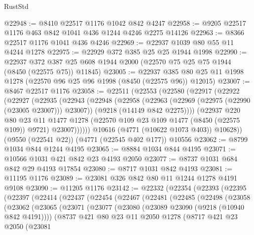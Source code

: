 \begin{lexlean}{RustStd}
\begin{coremodule}
@22948 := @8410 @22517 @1176 @1042 @842 @4247
@22958 := @9205 @22517 @1176 @463 @842 @1041 @436 @1244 @4246 @2275 @14126
@22963 := @8366 @22517 @1176 @1041 @436 @4246
@22969 := @22937 @1039 @80 @55 @11 @4244 @1278
@22975 := @22929 @372 @385 @25 @25 @1944 @1998
@22990 := @22937
    @372
    @387
    @25
    @608
    @1944
    @2000
    (@22570 @75 @25 @75 @1944 (@8450 (@22575 @75)) @11845)
@23005 := @22937 @385 @80 @25 @11 @1998 @1278 (@22570 @96 @25 @96 @1998 (@8450 (@22575 @96)) @12015)
@23007 := @8467 @22517 @1176
@23058 := @22511
    (@22553
      (@22580
        (@22917
          (@22922
            (@22927
              (@22935
                (@22943
                  (@22948
                    (@22958
                      (@22963 (@22969 (@22975 (@22990 (@23005 @23007))) @23007))
                      (@9218 (@14149 @842 @2275))))
                  (@22937
                    @220
                    @80
                    @23
                    @11
                    @1477
                    @1278
                    (@22570 @109 @23 @109 @1477 (@8450 (@22575 @109)) @9721)
                    @23007))))))
        @10616
        (@4771 (@10622 @1073 @403))
        @10628))
    (@9550 (@22541 @22))
    (@4771 (@22545 @402 @177))
    @10556
@23062 := @8799 @1034 @844 @1244 @4195
@23065 := @8884 @1034 @844 @4195
@23071 := @10566 @1031 @421 @842 @23 @4193 @2050
@23077 := @8737 @1031 @684 @842 @29 @4193 @17854
@23080 := @8717 @1031 @842 @4193
@23081 := @11195 @1176
@23089 := @23081 @326 @842 @80 @11 @1244 @1278 @4191 @9108
@23090 := @11205 @1176
@23142 := @22332
    (@22354
      (@22393
        (@22395
          (@22397
            (@22414
              (@22437
                (@22454
                  (@22467
                    (@22481
                      (@22485
                        (@22498
                          (@23058
                            (@23062
                              (@23065
                                (@23071
                                  (@23077
                                    (@23080 (@23089 @23090 (@9218 (@10940 @842 @4191))))
                                    (@8737
                                      @421
                                      @80
                                      @23
                                      @11
                                      @2050
                                      @1278
                                      (@8717
                                        @421
                                        @23
                                        @2050
                                        (@23081

\end{coremodule}
\end{lexlean}
